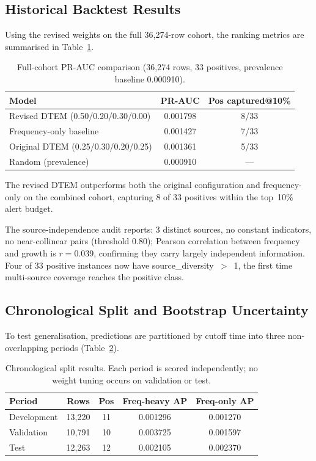 \documentclass[conference]{IEEEtran}
\begin{document}
\subsection{Historical Backtest Results}

Using the revised weights on the full 36{,}274-row cohort, the ranking metrics are summarised in Table~\ref{tab:results}.

\begin{table}[htbp]
\centering
\caption{Full-cohort PR-AUC comparison (36{,}274 rows, 33 positives, prevalence baseline 0.000910).}
\label{tab:results}
\begin{tabular}{|l|c|c|}
\hline
\textbf{Model} & \textbf{PR-AUC} & \textbf{Pos captured@10\%} \\
\hline
Revised DTEM (0.50/0.20/0.30/0.00) & 0.001798 & 8/33 \\
Frequency-only baseline & 0.001427 & 7/33 \\
Original DTEM (0.25/0.30/0.20/0.25) & 0.001361 & 5/33 \\
Random (prevalence) & 0.000910 & --- \\
\hline
\end{tabular}
\end{table}

The revised DTEM outperforms both the original configuration and frequency-only on the combined cohort, capturing 8 of 33 positives within the top~10\% alert budget.

The source-independence audit reports: 3 distinct sources, no constant indicators, no near-collinear pairs (threshold 0.80); Pearson correlation between frequency and growth is $r=0.039$, confirming they carry largely independent information. Four of 33 positive instances now have source\_diversity~$>$~1, the first time multi-source coverage reaches the positive class.

\subsection{Chronological Split and Bootstrap Uncertainty}
\label{sec:bootstrap}

To test generalisation, predictions are partitioned by cutoff time into three non-overlapping periods (Table~\ref{tab:split}).

\begin{table}[htbp]
\centering
\caption{Chronological split results. Each period is scored independently; no weight tuning occurs on validation or test.}
\label{tab:split}
\begin{tabular}{|l|c|c|c|c|}
\hline
\textbf{Period} & \textbf{Rows} & \textbf{Pos} & \textbf{Freq-heavy AP} & \textbf{Freq-only AP} \\
\hline
Development & 13{,}220 & 11 & 0.001296 & 0.001270 \\
Validation & 10{,}791 & 10 & 0.003725 & 0.001597 \\
Test & 12{,}263 & 12 & 0.002105 & 0.002370 \\
\hline
\end{tabular}
\end{table}
\end{document}
